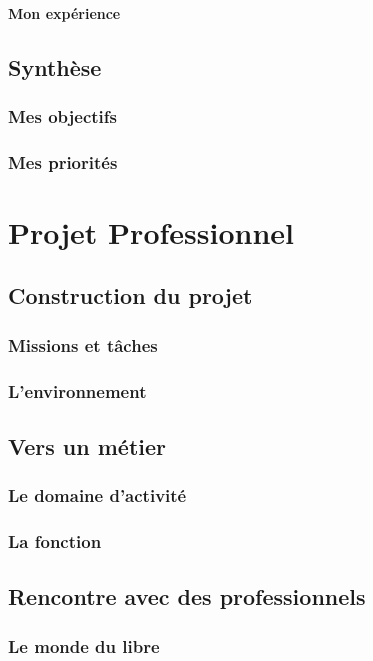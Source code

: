 \documentclass[a4paper,12pt, draft]{report}
\begin{document}
\subsection{Mon expérience}

\chapter{Synthèse}
\section{Mes objectifs}
\section{Mes priorités}

\part{Projet Professionnel}

\chapter{Construction du projet} 
\section{Missions et tâches}
\section{L'environnement}

\chapter{Vers un métier}
\section{Le domaine d'activité}
\section{La fonction}

\chapter{Rencontre avec des professionnels}
\section{Le monde du libre}
\end{document}
